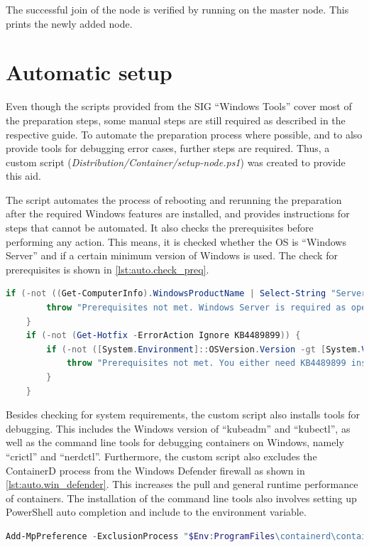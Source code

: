 The successful join of the node is verified by running  on the master node. This prints the newly added node.


\section{Automatic setup}
Even though the scripts provided from the \ac{SIG} \enquote{Windows Tools} cover most of the preparation steps, some manual steps are still required as described in the respective guide\cite{GitHubKubernetesSIGWindowsTools.20230213}. To automate the preparation process where possible, and to also provide tools for debugging error cases, further steps are required. Thus, a custom script (\textit{Distribution/Container/setup-node.ps1}) was created to provide this aid.

The script automates the process of rebooting and rerunning the preparation after the required \ac{Windows} features are installed, and provides instructions for steps that cannot be automated. It also checks the prerequisites before performing any action. This means, it is checked whether the \ac{OS} is \enquote{\ac{Windows} Server} and if a certain minimum version of \ac{Windows} is used. The check for prerequisites is shown in \autoref{lst:auto.check_preq}.
\begin{lstlisting}[label=lst:auto.check_preq, caption={Powershell commands in the automated setup script. Checks for prerequisites.}, language=PowerShell]
	if (-not ((Get-ComputerInfo).WindowsProductName | Select-String "Server")) {
		throw "Prerequisites not met. Windows Server is required as operating system."
	}
	if (-not (Get-Hotfix -ErrorAction Ignore KB4489899)) {
		if (-not ([System.Environment]::OSVersion.Version -gt [System.Version]"10.0.17763.0")) {
			throw "Prerequisites not met. You either need KB4489899 installed, or a Windows Version higher than 10.0.17763"
		}
	}
\end{lstlisting}

Besides checking for system requirements, the custom script also installs tools for debugging. This includes the \ac{Windows} version of \enquote{kubeadm} and \enquote{kubectl}, as well as the command line tools for debugging containers on \ac{Windows}, namely \enquote{crictl} and \enquote{nerdctl}.
Furthermore, the custom script also excludes the ContainerD process from the \ac{Windows} Defender firewall as shown in \autoref{lst:auto.win_defender}. This increases the pull and general runtime performance of containers.
The installation of the command line tools also involves setting up PowerShell auto completion and include to the  environment variable.
\begin{lstlisting}[label=lst:auto.win_defender, caption={Powershell command in the automated setup script. Exclusion of all actions performed by containerd.exe from Windows Defender.}, language=PowerShell, numbers=none]
	Add-MpPreference -ExclusionProcess "$Env:ProgramFiles\containerd\containerd.exe"
\end{lstlisting}


